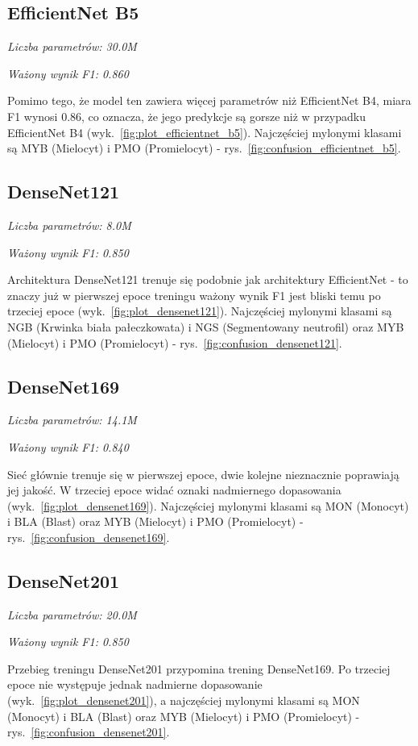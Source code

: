 \subsection{EfficientNet B5}
\textit{Liczba parametrów: 30.0M}

\textit{Ważony wynik F1: 0.860}

Pomimo tego, że model ten zawiera więcej parametrów niż EfficientNet B4, miara F1 wynosi 0.86, co oznacza, że jego predykcje są gorsze niż w przypadku EfficientNet B4 (wyk.~\ref{fig:plot_efficientnet_b5}).
Najczęściej mylonymi klasami są MYB (Mielocyt) i PMO (Promielocyt) - rys.~\ref{fig:confusion_efficientnet_b5}.

\subsection{DenseNet121}
\textit{Liczba parametrów: 8.0M}

\textit{Ważony wynik F1: 0.850}

Architektura DenseNet121 trenuje się podobnie jak architektury EfficientNet - to znaczy już w pierwszej epoce treningu ważony wynik F1 jest bliski temu po trzeciej epoce (wyk.~\ref{fig:plot_densenet121}).
Najczęściej mylonymi klasami są NGB (Krwinka biała pałeczkowata) i NGS (Segmentowany neutrofil) oraz MYB (Mielocyt) i PMO (Promielocyt) - rys.~\ref{fig:confusion_densenet121}.

\subsection{DenseNet169}
\textit{Liczba parametrów: 14.1M}

\textit{Ważony wynik F1: 0.840}

Sieć głównie trenuje się w pierwszej epoce, dwie kolejne nieznacznie poprawiają jej jakość.
W trzeciej epoce widać oznaki nadmiernego dopasowania (wyk.~\ref{fig:plot_densenet169}).
Najczęściej mylonymi klasami są MON (Monocyt) i BLA (Blast) oraz MYB (Mielocyt) i PMO (Promielocyt) - rys.~\ref{fig:confusion_densenet169}.

\subsection{DenseNet201}
\textit{Liczba parametrów: 20.0M}

\textit{Ważony wynik F1: 0.850}

Przebieg treningu DenseNet201 przypomina trening DenseNet169.
Po trzeciej epoce nie występuje jednak nadmierne dopasowanie (wyk.~\ref{fig:plot_densenet201}), a najczęściej mylonymi klasami są MON (Monocyt) i BLA (Blast) oraz MYB (Mielocyt) i PMO (Promielocyt) - rys.~\ref{fig:confusion_densenet201}.

